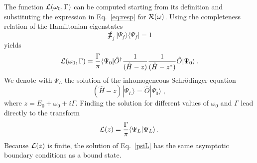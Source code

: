 The function ${\cal L}(\omega_0,\Gamma)$ can be computed starting from its definition and substituting the expression in Eq.~\eqref{eq:resp} for ${\cal R}(\omega)$. Using the completeness relation of the Hamiltonian eigenstates 
\begin{equation}
\sumint_f | \Psi_f \rangle \langle \Psi_f | =1 
\end{equation}
yields 
\begin{align}
{\cal L}(\omega_0,\Gamma)=\frac{\Gamma}{\pi} \langle \Psi_0|{ \hat O}^\dagger \frac{1}{( \hat H - z) } \frac{1}{(\hat H - z^\ast)} \hat O |\Psi_0 \rangle\, .
\end{align}
We denote with $\Psi_L$ the solution of the inhomogeneous  Schr\"odinger equation
\begin{equation}\label{psiL}
( \hat H - z) |\Psi_L\rangle = \hat O | \Psi_0 \rangle \;,
\end{equation}
where \(z = E_0 + \omega_0 + i\Gamma\). Finding the solution for different values of $\omega_0$ and $\Gamma$ lead directly to the transform
\begin{equation}
{\cal L}(z)= \frac{\Gamma}{\pi}\langle \Psi_L |\Psi_L\rangle\, .
\end{equation}
Because ${\cal L}(z)$ is finite, the solution of Eq.~\eqref{psiL} has the same asymptotic boundary conditions as a bound state.

